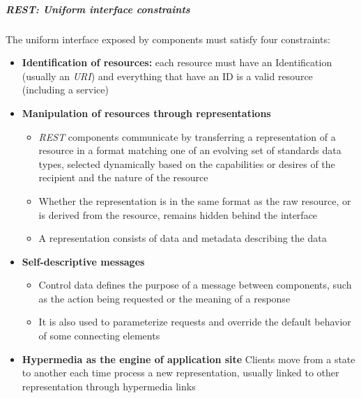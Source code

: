     \subparagraph{REST: Uniform interface constraints}
    The uniform interface exposed by components must satisfy four constraints:
    \begin{itemize}
        \item \textbf{Identification of resources:} each resource must have an Identification
            (usually an \textit{URI}) and everything that have an ID is a valid resource 
            (including a service)
        \item \textbf{Manipulation of resources through representations}
        \begin{itemize}
            \item \textit{REST} components communicate by transferring a representation of a
                resource in a format matching one of an evolving set of standards data types,
                selected dynamically based on the capabilities or desires of the recipient and
                the nature of the resource
            \item Whether the representation is in the same format as the raw
                resource, or is derived from the resource, remains hidden behind the interface
            \item A representation consists of data and metadata describing the data
        \end{itemize}
        \item \textbf{Self-descriptive messages}
        \begin{itemize}
            \item Control data defines the purpose of a message between components, such as the 
                action being requested or the meaning of a response
            \item It is also used to parameterize requests and override the default behavior of
                some connecting elements
        \end{itemize}
        \item \textbf{Hypermedia as the engine of application site}
            Clients move from a state to another each time process a new representation, usually
            linked to other representation through hypermedia links
    \end{itemize}

